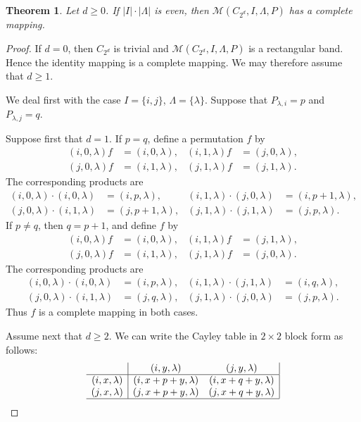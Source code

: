 \documentclass[11pt]{article}
\theoremstyle{plain}
\newtheorem{theorem}{Theorem}[section]
\theoremstyle{remark}
\theoremstyle{definition}
\theoremstyle{plain}
\begin{document}
\begin{theorem}\label{Thm:ILambda_even}
{Let $d\ge0$. If $|I|\cdot|\Lambda|$ is even, then
$\mathcal{M}(C_{2^d},I,\Lambda,P)$ has a complete mapping.}
\end{theorem}
\begin{proof}

If $d=0$, then $C_{2^d}$ is trivial and
$\mathcal{M}(C_{2^d},I,\Lambda,P)$ is a rectangular band. Hence the identity
mapping is a complete mapping. We may therefore assume that $d\ge1$.

We deal first with the case $I=\{i,j\}$, $\Lambda=\{\lambda\}$. Suppose
that $P_{\lambda,i}=p$ and $P_{\lambda,j}=q$.

Suppose first that $d=1$. If $p=q$, define a permutation $f$ by
\begin{align*}
(i,0,\lambda)f&=(i,0,\lambda), &
(i,1,\lambda)f&=(j,0,\lambda),\\
(j,0,\lambda)f&=(i,1,\lambda), &
(j,1,\lambda)f&=(j,1,\lambda).
\end{align*}
The corresponding products are
\begin{align*}
(i,0,\lambda)\cdot(i,0,\lambda)&=(i,p,\lambda), &
(i,1,\lambda)\cdot(j,0,\lambda)&=(i,p+1,\lambda),\\
(j,0,\lambda)\cdot(i,1,\lambda)&=(j,p+1,\lambda), &
(j,1,\lambda)\cdot(j,1,\lambda)&=(j,p,\lambda).
\end{align*}
If $p\ne q$, then $q=p+1$, and define $f$ by
\begin{align*}
(i,0,\lambda)f&=(i,0,\lambda), &
(i,1,\lambda)f&=(j,1,\lambda),\\
(j,0,\lambda)f&=(i,1,\lambda), &
(j,1,\lambda)f&=(j,0,\lambda).
\end{align*}
The corresponding products are
\begin{align*}
(i,0,\lambda)\cdot(i,0,\lambda)&=(i,p,\lambda), &
(i,1,\lambda)\cdot(j,1,\lambda)&=(i,q,\lambda),\\
(j,0,\lambda)\cdot(i,1,\lambda)&=(j,q,\lambda), &
(j,1,\lambda)\cdot(j,0,\lambda)&=(j,p,\lambda).
\end{align*}
Thus $f$ is a complete mapping in both cases.

 Assume next that
$d\ge2$.
We can write the Cayley table in $2\times2$ block form as follows:
\[\begin{array}{c|cc|}
&(i,y,\lambda)&(j,y,\lambda)\\
\hline
(i,x,\lambda) & (i,x+p+y,\lambda) & (i,x+q+y,\lambda) \\
(j,x,\lambda) & (j,x+p+y,\lambda) & (j,x+q+y,\lambda) \\
\hline
\end{array}\]


\end{proof}
\end{document}
